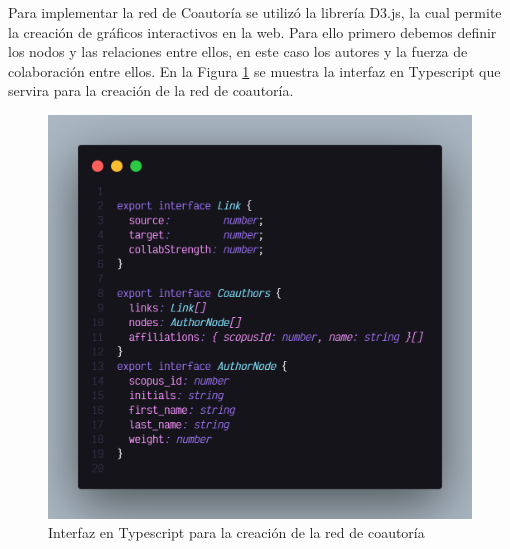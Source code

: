 Para implementar la red de Coautoría se utilizó la librería D3.js, la cual permite la creación de gráficos interactivos en la web.
Para ello primero debemos definir los nodos y las relaciones entre ellos, en este caso los autores y la fuerza de colaboración entre ellos.
En la Figura \ref{fig:network-interface-ts} se muestra la interfaz en Typescript que servira para la creación de la red de coautoría.

\begin{figure}[H]
    \centering
    \includegraphics[scale=0.26]{../02Figures/02Chapter/Sprints/Sprint-2/coauthors-interface-typescript.png}
    \caption{Interfaz en Typescript para la creación de la red de coautoría}
    \label{fig:network-interface-ts}
\end{figure}


